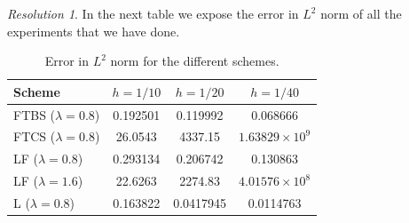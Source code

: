 \documentclass[10pt,a4paper]{article}
\theoremstyle{definition}
\theoremstyle{remark}
\newtheorem*{res}{Resolution}
\begin{document}
\begin{res}
  In the next table we expose the error in $L^2$ norm of all the experiments that we have done.
  \begin{table}[ht]
    \centering
    \begin{tabular}{|l|c|c|c|}
      \hline
      Scheme               & $h=1/10$ & $h=1/20$  & $h=1/40$             \\
      \hline\hline
      FTBS ($\lambda=0.8$) & 0.192501 & 0.119992  & 0.068666             \\
      FTCS ($\lambda=0.8$) & 26.0543  & 4337.15   & $1.63829\times 10^9$ \\
      LF ($\lambda=0.8$)   & 0.293134 & 0.206742  & 0.130863             \\
      LF ($\lambda=1.6$)   & 22.6263  & 2274.83   & $4.01576\times 10^8$ \\
      L ($\lambda=0.8$)    & 0.163822 & 0.0417945 & 0.0114763            \\
      \hline
    \end{tabular}
    \caption{Error in $L^2$ norm for the different schemes.}
  \end{table}


\end{res}
\end{document}
